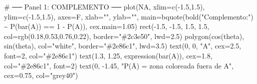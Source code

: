 \documentclass[
  letterpaper,
  DIV=11,
  numbers=noendperiod]{scrartcl}
\newenvironment{Shaded}{\begin{snugshade}}{\end{snugshade}}
\newcommand{\AttributeTok}[1]{\textcolor[rgb]{0.40,0.45,0.13}{#1}}
\newcommand{\CommentTok}[1]{\textcolor[rgb]{0.37,0.37,0.37}{#1}}
\newcommand{\ConstantTok}[1]{\textcolor[rgb]{0.56,0.35,0.01}{#1}}
\newcommand{\DecValTok}[1]{\textcolor[rgb]{0.68,0.00,0.00}{#1}}
\newcommand{\FloatTok}[1]{\textcolor[rgb]{0.68,0.00,0.00}{#1}}
\newcommand{\FunctionTok}[1]{\textcolor[rgb]{0.28,0.35,0.67}{#1}}
\newcommand{\NormalTok}[1]{\textcolor[rgb]{0.00,0.23,0.31}{#1}}
\newcommand{\SpecialCharTok}[1]{\textcolor[rgb]{0.37,0.37,0.37}{#1}}
\newcommand{\StringTok}[1]{\textcolor[rgb]{0.13,0.47,0.30}{#1}}
\begin{document}
\begin{Shaded}
\begin{Highlighting}[]
\CommentTok{\# ── Panel 1: COMPLEMENTO ──}
\FunctionTok{plot}\NormalTok{(}\ConstantTok{NA}\NormalTok{, }\AttributeTok{xlim=}\FunctionTok{c}\NormalTok{(}\SpecialCharTok{{-}}\FloatTok{1.5}\NormalTok{,}\FloatTok{1.5}\NormalTok{), }\AttributeTok{ylim=}\FunctionTok{c}\NormalTok{(}\SpecialCharTok{{-}}\FloatTok{1.5}\NormalTok{,}\FloatTok{1.5}\NormalTok{), }\AttributeTok{axes=}\NormalTok{F, }\AttributeTok{xlab=}\StringTok{""}\NormalTok{, }\AttributeTok{ylab=}\StringTok{""}\NormalTok{,}
     \AttributeTok{main=}\FunctionTok{bquote}\NormalTok{(}\FunctionTok{bold}\NormalTok{(}\StringTok{"Complemento:"}\NormalTok{) }\SpecialCharTok{\textasciitilde{}} \FunctionTok{P}\NormalTok{(}\FunctionTok{bar}\NormalTok{(A)) }\SpecialCharTok{==} \DecValTok{1} \SpecialCharTok{{-}} \FunctionTok{P}\NormalTok{(A)),}
     \AttributeTok{cex.main=}\FloatTok{1.05}\NormalTok{)}
\FunctionTok{rect}\NormalTok{(}\SpecialCharTok{{-}}\FloatTok{1.5}\NormalTok{, }\SpecialCharTok{{-}}\FloatTok{1.5}\NormalTok{, }\FloatTok{1.5}\NormalTok{, }\FloatTok{1.5}\NormalTok{, }\AttributeTok{col=}\FunctionTok{rgb}\NormalTok{(}\FloatTok{0.18}\NormalTok{,}\FloatTok{0.53}\NormalTok{,}\FloatTok{0.76}\NormalTok{,}\FloatTok{0.22}\NormalTok{), }\AttributeTok{border=}\StringTok{"\#2c3e50"}\NormalTok{, }\AttributeTok{lwd=}\FloatTok{2.5}\NormalTok{)}
\FunctionTok{polygon}\NormalTok{(}\FunctionTok{cos}\NormalTok{(theta), }\FunctionTok{sin}\NormalTok{(theta), }\AttributeTok{col=}\StringTok{"white"}\NormalTok{, }\AttributeTok{border=}\StringTok{"\#2e86c1"}\NormalTok{, }\AttributeTok{lwd=}\FloatTok{3.5}\NormalTok{)}
\FunctionTok{text}\NormalTok{(}\DecValTok{0}\NormalTok{, }\DecValTok{0}\NormalTok{, }\StringTok{"A"}\NormalTok{, }\AttributeTok{cex=}\FloatTok{2.5}\NormalTok{, }\AttributeTok{font=}\DecValTok{2}\NormalTok{, }\AttributeTok{col=}\StringTok{"\#2e86c1"}\NormalTok{)}
\FunctionTok{text}\NormalTok{(}\FloatTok{1.3}\NormalTok{, }\FloatTok{1.25}\NormalTok{, }\FunctionTok{expression}\NormalTok{(}\FunctionTok{bar}\NormalTok{(A)), }\AttributeTok{cex=}\FloatTok{1.8}\NormalTok{, }\AttributeTok{col=}\StringTok{"\#2e86c1"}\NormalTok{, }\AttributeTok{font=}\DecValTok{2}\NormalTok{)}
\FunctionTok{text}\NormalTok{(}\DecValTok{0}\NormalTok{, }\SpecialCharTok{{-}}\FloatTok{1.45}\NormalTok{, }\StringTok{"P(Ā) = zona coloreada fuera de A"}\NormalTok{, }\AttributeTok{cex=}\FloatTok{0.75}\NormalTok{, }\AttributeTok{col=}\StringTok{"grey40"}\NormalTok{)}


\end{Highlighting}
\end{Shaded}
\end{document}
